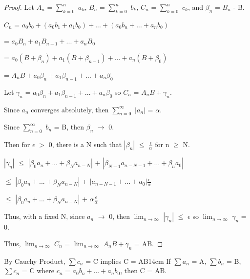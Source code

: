     \begin{proof}
        Let $A_n$ = $\sum_{k=0}^{n}$ $a_k$, $B_n$ = $\sum_{k=0}^{n}$ $b_k$,
        $C_n$ = $\sum_{k=0}^{n}$ $c_k$, and $\beta_n$ = $B_n$ - B.

        \hspace{1cm}
        $C_n$
        = $a_0b_0 + (a_0b_1 + a_1b_0) + ... + (a_0b_n + ... + a_nb_0)$
        
        \hspace{1.6cm}
        = $a_0B_n + a_1B_{n-1} + ... + a_nB_0$

        \hspace{1.6cm}
        = $a_0(B + \beta_n) + a_1(B + \beta_{n-1}) + ... + a_n(B + \beta_{0})$

        \hspace{1.6cm}
        = $A_nB + a_0\beta_n + a_1\beta_{n-1} + ... + a_n\beta_0$

        Let $\gamma_n$ = $a_0\beta_n + a_1\beta_{n-1} + ... + a_n\beta_0$
        so $C_n$ = $A_nB + \gamma_n$.

        Since $a_n$ converges absolutely, then
        $\sum_{n=0}^{\infty}$ $|a_n|$ = $\alpha$.

        Since $\sum_{n=0}^{\infty}$ $b_n$ = B, then $\beta_n$ $\rightarrow$ 0.
        
        Then for $\epsilon$ $>$ 0, there is a N such that
        $|\beta_n|$ $\leq$ $\frac{\epsilon}{\alpha}$ for n $\geq$ N.

        \hspace{1cm}
        $|\gamma_n|$
        $\leq$ $|\beta_0a_n + ... + \beta_Na_{n-N}|$
        + $|\beta_{N+1}a_{n-N-1} + ... + \beta_na_{0}|$

        \hspace{1.75cm}
        $\leq$ $|\beta_0a_n + ... + \beta_Na_{n-N}|$
        + $|a_{n-N-1} + ... + a_{0}|$$\frac{\epsilon}{\alpha}$

        \hspace{1.75cm}
        $\leq$ $|\beta_0a_n + ... + \beta_Na_{n-N}|$
        + $\alpha \frac{\epsilon}{\alpha}$

        Thus, with a fixed N, since $a_n$ $\rightarrow$ 0, then
        $\lim_{n \rightarrow \infty}$ $|\gamma_n|$ $\leq$ $\epsilon$
        so $\lim_{n \rightarrow \infty}$ $\gamma_n$ = 0.

        Thus, $\lim_{n \rightarrow \infty}$ $C_n$
        = $\lim_{n \rightarrow \infty}$ $A_nB + \gamma_n$ = AB.
    \end{proof}

    \vspace{0.5cm}



    \begin{wtheorem}{By Cauchy Product, $\sum c_n$ = C implies C = AB}{14cm}
        If $\sum a_n$ = A, $\sum b_n$ = B, $\sum c_n$ = C
        where $c_n$ = $a_0b_n + ... + a_nb_0$, then C = AB.
    \end{wtheorem}